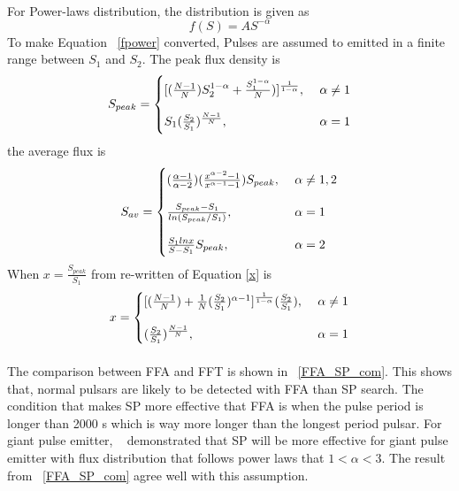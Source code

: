 \documentclass[thesis_msc.tex]{subfiles}
\begin{document}
   \paragraph{} For Power-laws distribution, the distribution is given as 
\begin{equation}
f(S)=AS^{-\alpha} \label{fpower}
\end{equation}
    To make Equation ~\ref{fpower} converted, Pulses are assumed to emitted in a finite range between $S_1$ and $S_2$. The peak flux density is 
  \begin{equation}
  S_{peak}=\left\{
    \begin{array}{@{}ll@{}}
    [(\frac{N-1}{N})S_2^{1-\alpha}+\frac{S^{1-\alpha}_1}{N})]^{\frac{1}{1-\alpha}}, & \ \alpha \neq 1 \\ \\
    S_1(\frac{S_2}{S_1})^{\frac{N-1}{N}}, & \ \alpha = 1
  \end{array}\right. \label{Speakpo}
  \end{equation}
  the average flux is 
  \begin{equation}
  S_{av}=\left\{
    \begin{array}{@{}ll@{}}
    (\frac{\alpha-1}{\alpha-2})(\frac{x^{\alpha-2}-1}{x^{\alpha-1}-1}) S_{peak}, & \ \alpha \neq 1,2 \\ \\
    \frac{S_{peak}-S_1}{ln(S_{peak}/S_1)}, & \ \alpha = 1 \\ \\
    \frac{S_1 ln x}{S-S_1} S_{peak}, & \ \alpha = 2
  \end{array}\right.
  \end{equation}
   When $x = \frac{S_{peak}}{S_1}$ from re-written of Equation \ref{x} is 
   \begin{equation}
  x=\left\{
    \begin{array}{@{}ll@{}}
    [(\frac{N-1}{N})+\frac{1}{N}(\frac{S_2}{S_1})^{\alpha-1}]^{\frac{1}{1-\alpha}} (\frac{S_2}{S_1}), & \ \alpha \neq 1 \\ \\
    (\frac{S_2}{S_1})^{\frac{N-1}{N}}, & \ \alpha = 1
  \end{array}\right. \label{x}
  \end{equation}\paragraph{} The comparison between FFA and FFT is shown in ~\ref{FFA_SP_com}. This shows that,  normal pulsars are likely to be detected with FFA than SP search.  The condition that makes SP more effective that FFA is when the pulse period is longer than 2000 s which is way more longer than the longest period  pulsar.  For giant pulse emitter, ~\cite{keane2011transient} demonstrated that SP will be more effective for giant pulse emitter with flux distribution that follows power laws that $1<\alpha<3$.  The result from ~\ref{FFA_SP_com} agree well with this assumption.  
  
\end{document}
